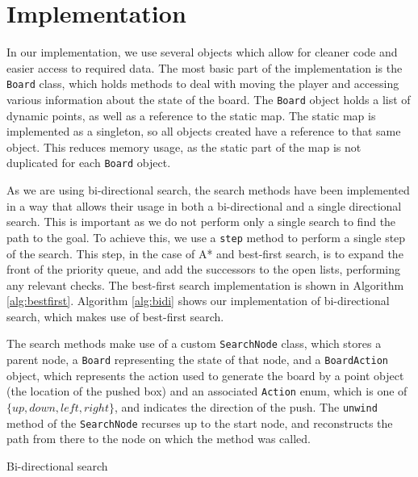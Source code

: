 \documentclass[a4paper,11pt]{article}
\begin{document}
\section{Implementation}
In our implementation, we use several objects which allow for cleaner code and
easier access to required data. The most basic part of the implementation is the
\texttt{Board} class, which holds methods to deal with moving the player and
accessing various information about the state of the board. The \texttt{Board}
object holds a list of dynamic points, as well as a reference to the static
map. The static map is implemented as a singleton, so all objects created have a
reference to that same object. This reduces memory usage, as the static part of
the map is not duplicated for each \texttt{Board} object.

As we are using bi-directional search, the search methods have been implemented
in a way that allows their usage in both a bi-directional and a single
directional search. This is important as we do not perform only a single search
to find the path to the goal. To achieve this, we use a \texttt{step} method to
perform a single step of the search. This step, in the case of A* and best-first
search, is to expand the front of the priority queue, and add the successors to
the open lists, performing any relevant checks. The best-first search
implementation is shown in Algorithm \ref{alg:bestfirst}. Algorithm
\ref{alg:bidi} shows our implementation of bi-directional search, which makes
use of best-first search.

The search methods make use of a custom \texttt{SearchNode} class, which stores
a parent node, a \texttt{Board} representing the state of that node, and a
\texttt{BoardAction} object, which represents the action used to generate the
board by a point object (the location of the pushed box) and an associated
\texttt{Action} enum, which is one of $\{up, down, left, right\}$, and indicates
the direction of the push. The \texttt{unwind} method of the \texttt{SearchNode}
recurses up to the start node, and reconstructs the path from there to the node
on which the method was called.

\begin{algorithm}
  \DontPrintSemicolon

\caption{Bi-directional search}
\label{alg:bidi}
\end{algorithm}
\end{document}
